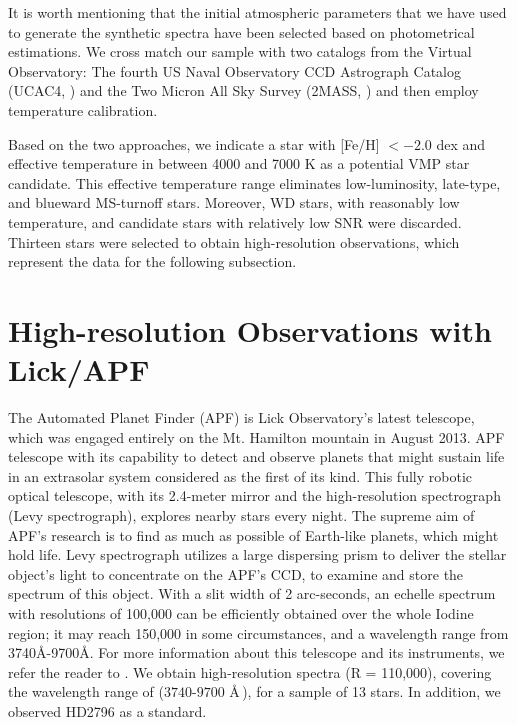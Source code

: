 It is worth mentioning that the initial atmospheric parameters that we have used to generate the synthetic spectra have been selected based on photometrical estimations. We cross match our sample with two catalogs 
from the Virtual Observatory:  The fourth US Naval Observatory CCD Astrograph Catalog (UCAC4, \citealt{2013AJ....145...44Z} ) and the Two Micron All Sky Survey (2MASS, \citealt{2006AJ....131.1163S}) and then
employ \citet{2005ApJ...626..465R} temperature calibration.

Based on the two approaches, we indicate a star with [Fe/H] $< -2.0$ dex and effective temperature in between 4000 and 7000 K as a potential VMP star candidate. This effective temperature range eliminates low-luminosity, late-type, and blueward MS-turnoff stars. Moreover, WD stars, with reasonably low temperature, and candidate stars with relatively low SNR were discarded. Thirteen stars were selected to obtain high-resolution observations, which represent the data for the following subsection.


\section{High-resolution Observations with Lick/APF}

The Automated Planet Finder (APF) is Lick Observatory's latest telescope, which was engaged entirely on the Mt. Hamilton mountain in August 2013. APF telescope with its capability to detect and observe planets that might sustain life in an extrasolar system considered as the first of its kind. This fully robotic optical telescope, with its 2.4-meter mirror and the high-resolution spectrograph (Levy spectrograph),  explores nearby stars every night. The supreme aim of APF's research is to find as much as possible of Earth-like planets, which might hold life. Levy spectrograph utilizes a large dispersing prism to deliver the stellar object's light to concentrate on the APF's CCD, to examine and store the spectrum of this object. With a slit width of 2 arc-seconds, an echelle spectrum with resolutions of 100,000  can be efficiently obtained over the whole Iodine region; it may reach 150,000 in some circumstances, and a wavelength range from 3740{\AA}-9700{\AA}. For more information about this telescope and its instruments, we refer the reader to \citet{2014SPIE.9145E..2BR}. We obtain high-resolution spectra (R = 110,000), covering the wavelength range of ($3740$-$9700$ {\AA}\,), for a sample of 13 stars. In addition, we observed HD2796 as a standard. 


